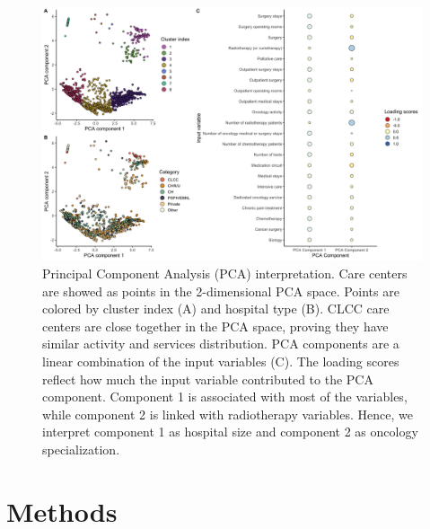 \begin{figure}[h]
    \includegraphics[width=\textwidth]{images/camion/supplemental/sup_fig1_pca_and_clustering.png}
    \centering
    \caption{
        Principal Component Analysis (PCA) interpretation. Care centers are showed as points in the 2-dimensional PCA space. Points are colored by cluster index (A) and hospital type (B). CLCC care centers are close together in the PCA space, proving they have similar activity and services distribution. PCA components are a linear combination of the input variables (C). The loading scores reflect how much the input variable contributed to the PCA component. Component 1 is associated with most of the variables, while component 2 is linked with radiotherapy variables. Hence, we interpret component 1 as hospital size and component 2 as oncology specialization.
    }
    \label{fig:clustering-pca}
\end{figure}

\section{Methods}

